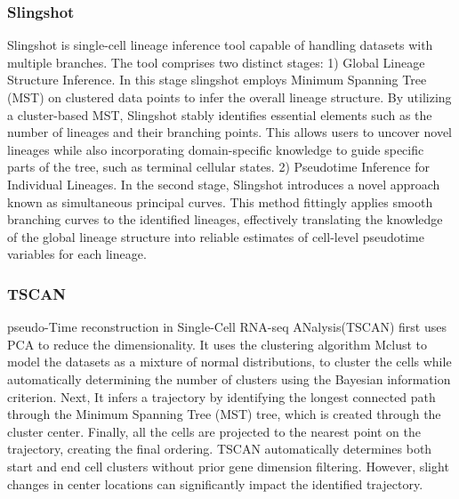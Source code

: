 \subsubsection{Slingshot}
Slingshot is single-cell lineage inference tool capable of handling datasets with multiple branches\citep{street2018slingshot}. The tool comprises two distinct stages: 1) Global Lineage Structure Inference. In this stage slingshot employs Minimum Spanning Tree (MST) on clustered data points to infer the overall lineage structure. By utilizing a cluster-based MST, Slingshot stably identifies essential elements such as the number of lineages and their branching points. This allows users to uncover novel lineages while also incorporating domain-specific knowledge to guide specific parts of the tree, such as terminal cellular states. 2) Pseudotime Inference for Individual Lineages. In the second stage, Slingshot introduces a novel approach known as simultaneous principal curves. This method fittingly applies smooth branching curves to the identified lineages, effectively translating the knowledge of the global lineage structure into reliable estimates of cell-level pseudotime variables for each lineage.
\subsubsection{TSCAN}
pseudo-Time reconstruction in Single-Cell RNA-seq ANalysis(TSCAN)\citep{ji2016tscan} first uses PCA to reduce the dimensionality. It uses the clustering algorithm Mclust to model the datasets as a mixture of normal distributions, to cluster the cells while automatically determining the number of clusters using the Bayesian information criterion. Next, It infers a trajectory by identifying the longest connected path through the Minimum Spanning Tree (MST) tree, which is created through the cluster center. Finally, all the cells are projected to the nearest point on the trajectory, creating the final ordering. TSCAN automatically determines both start and end cell clusters without prior gene dimension filtering. However, slight changes in center locations can significantly impact the identified trajectory.
